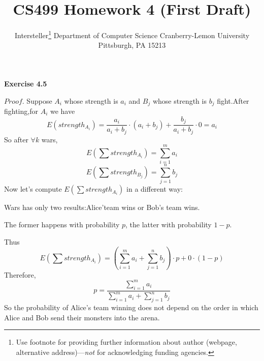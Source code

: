 \documentclass{article} %
\title{CS499 Homework 4 (First Draft)}
\author{
	Intersteller\thanks{ Use footnote for providing further information
		about author (webpage, alternative address)---\emph{not} for acknowledging
		funding agencies.}
	Department of Computer Science
	Cranberry-Lemon University
	Pittsburgh, PA 15213
}
\begin{document}
    \textbf{Exercise 4.5}\par
    $Proof$.
    Suppose $A_i$ whose strength is $a_i$ and $B_j$ whose strength is $b_j$ fight.After fighting,for $A_i$ we have
    $$
    E(strength_{A_i})=\frac{a_i}{a_i+b_j}\cdot (a_i+b_j)+\frac{b_j}{a_i+b_j}\cdot 0=a_i
    $$
    So after $\forall k$ wars,
    $$
    E(\sum strength_{A_i})=\sum_{i=1}^{m}a_i
    $$
    $$
    E(\sum strength_{B_j})=\sum_{j=1}^{n}b_j
    $$
    Now let's compute $E(\sum strength_{A_i})$ in a different way:\par
    Wars has only two results:Alice'team wins or Bob's team wins.\par
    The former happens with probability $p$,
    the latter with probability $1-p$.\par
    Thus
    $$
    E(\sum strength_{A_i})=(\sum_{i=1}^{m}a_i+\sum_{j=1}^{n}b_j)\cdot p+0\cdot (1-p)
    $$
    Therefore,
    $$
    p=\frac{\sum_{i=1}^{m}a_i}{\sum_{i=1}^{m}a_i+\sum_{j=1}^{n}b_j}
    $$
    So the probability of Alice's team winning does not depend on the order in which Alice and Bob send their monsters into the arena.
\end{document}
